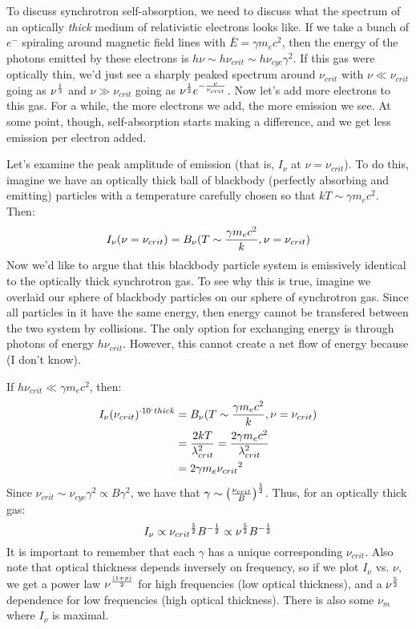\documentclass[11pt]{article}
\def\_{\bar}
\def\hf{{1 \over 2}}
\def\e#1{\cdot10^{#1}}
\begin{document}
To discuss synchrotron self-absorption, we need to discuss what the spectrum
of an optically {\it thick} medium of relativistic electrons looks like.
If we take a bunch of $e^-$ spiraling around magnetic field lines with
$\_E=\gamma m_ec^2$, then the energy of the photons emitted by these
electrons is $h\nu\sim h\nu_{crit}\sim h\nu_{cyc}\gamma^2$.  If this gas
were optically thin, we'd just see a sharply peaked spectrum around $\nu_{crit}$
with $\nu\ll\nu_{crit}$ going as $\nu^{1\over3}$ and $\nu\gg\nu_{crit}$ going
as $\nu^\hf e^{-{\nu\over\nu_{crit}}}$.  Now let's add more electrons to this
gas.  For a while, the more electrons we add, the more emission we see.
At some point, though, self-absorption starts making a difference, and we
get less emission per electron added.\par
Let's examine the 
peak amplitude of emission (that is, $I_\nu$ at $\nu=\nu_{crit}$).  
To do this,
imagine we have an optically thick ball of blackbody (perfectly absorbing 
and emitting) particles
with a temperature carefully chosen so that $kT\sim\gamma m_e c^2$. Then:
\def\nucrit{{\nu_{crit}}}
$$I_\nu(\nu=\nucrit)=B_\nu(T\sim{\gamma m_ec^2\over k},\nu=\nucrit)$$
Now we'd like to argue that this blackbody particle system is emissively 
identical to
the optically thick synchrotron gas.  To see why this is true, imagine we
overlaid our sphere of blackbody particles on our sphere of synchrotron gas.
Since all particles in it have the same energy, then energy cannot be
transfered between the two system by collisions.  The only option for exchanging
energy is through photons of energy $h\nucrit$.  However, this cannot create
a net flow of energy because (I don't know).\par
If $h\nucrit\ll\gamma m_ec^2$, then:
$$\begin{aligned}I_\nu(\nucrit)^{\e,thick}
&=B_\nu(T\sim{\gamma m_ec^2\over k},\nu=\nucrit)\\ 
&={2kT\over\lambda_{crit}^2}={2\gamma m_ec^2\over\lambda_{crit}^2}\\ 
&=2\gamma m_e\nucrit^2\\ \end{aligned}$$
Since $\nucrit\sim\nu_{cyc}\gamma^2\propto B\gamma^2$, we have that
$\gamma\sim\left({\nucrit\over B}\right)^\hf$.  Thus, for an optically
thick gas:
$$I_\nu\propto\nucrit^{5\over2}B^{-\hf}\propto\nu^{5\over2}B^{-\hf}$$
It is important to remember that each $\gamma$ has a unique corresponding
$\nucrit$.  Also note that optical thickness depends inversely on frequency,
so if we plot $I_\nu$ vs. $\nu$, we get a power law $\nu^{(1+p)\over2}$ for
high frequencies (low optical thickness), and a $\nu^{5\over2}$ dependence
for low frequencies (high optical thickness).  There is also some $\nu_m$ where
$I_\nu$ is maximal.
\end{document}

